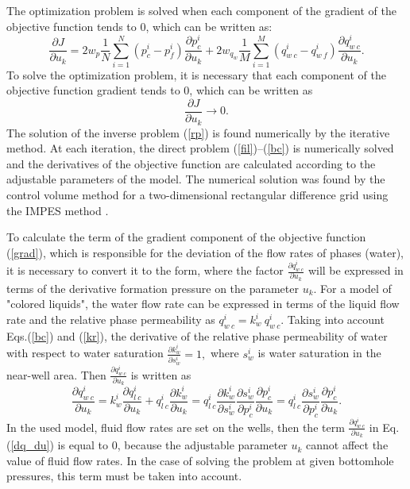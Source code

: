 \documentclass[
11pt,%
tightenlines,%
twoside,%
onecolumn,%
nofloats,%
nobibnotes,%
nofootinbib,%
superscriptaddress,%
noshowpacs,%
centertags]%
{revtex4}
\begin{document}
The optimization problem is solved when each component of the gradient of the objective function tends to 0, which can be written as:
\begin{equation}\label{grad}
\frac{\partial J}{\partial u_k} = 2w_p\frac{1}{N}\sum_{i=1}^N
({p_c^i-p_f^i}) \frac{\partial p_c^i}{\partial
u_k}+2w_{q_w}\frac{1}{M}\sum_{i=1}^M{\left(q_{w\:c}^i-q_{w\:f}^i\right)}\frac{\partial
q_{w\:c}^i}{\partial u_k}.
\end{equation}
To solve the optimization problem, it is necessary that each
component  of the objective function gradient tends to 0, which can
be written as
\begin{equation} \label{rp}
     \frac{\partial J}{\partial u_k} \rightarrow 0.
\end{equation}
The solution of the inverse problem (\ref{rp}) is found  numerically
by the iterative method. At each iteration, the direct problem
(\ref{fil})--(\ref{bc}) is numerically solved and the derivatives of
the objective function are calculated according to the adjustable
parameters of the \cite{opt} model. The numerical solution was found
by the control volume method for a two-dimensional rectangular
difference grid using the IMPES method \cite{azi}.

To calculate the term of the gradient  component of the objective
function (\ref{grad}), which is responsible for the deviation of the
flow rates of phases (water), it is necessary to convert it to the
form, where the factor $\frac{\partial q_{w\:c}^i}{\partial u_k}$
will be expressed in terms of the derivative formation pressure on
the parameter $u_k$. For a model of "colored liquids", the water flow
rate can be expressed in terms of the liquid flow rate and the
relative phase permeability as
 $
    q_{w\:c}^i = k_{w}^i \: q_{w\:c}^i.
 $
Taking into account Eqs.(\ref{bc}) and (\ref{kr}), the derivative of the
relative phase permeability of water with respect to water
saturation
 $
    \frac{\partial k_{w}^i}{\partial s_w^i} = 1,
$
where $s_w^i$ is water saturation in the near-well area. Then $\frac{\partial q_{w\:c}^i}{\partial u_k}$ is written as
\begin{equation} \label{dq_du}
\frac{\partial q_{w\:c}^i}{\partial u_k} = k_{w}^i  \frac{\partial
q_{l\:c}^i}{\partial u_k} + q_{l\:c}^i \frac{\partial
k_{w}^i}{\partial u_k} = q_{l\:c}^i \frac{\partial k_{w}^i}{\partial
s_w^i} \frac{\partial s_w^i}{\partial p_c^i}\frac{\partial
p_c^i}{\partial u_k} =  q_{l\:c}^i  \frac{\partial s_w^i}{\partial
p_c^i}\frac{\partial p_c^i}{\partial u_k}.
\end{equation}
In the used model, fluid flow rates are set on the wells, then the term $\frac{\partial q_{w\:c}^i}{\partial u_k}$ in Eq. (\ref{dq_du}) is equal to 0, because the adjustable parameter $u_k$ cannot affect the value of fluid flow rates. In
the case of solving the problem at given bottomhole pressures, this
term must be taken into account.
\end{document}
